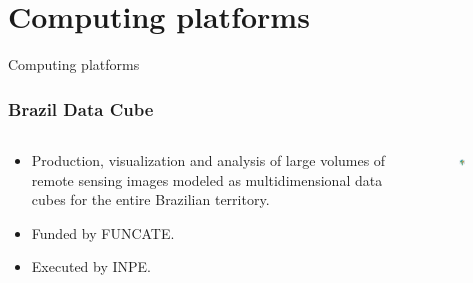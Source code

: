 \documentclass[aspectratio=169]{beamer}
\begin{document}
\section{Computing platforms}



\begin{frame}
    Computing platforms
\end{frame}



\begin{frame}
    \frametitle{Brazil Data Cube}
    \begin{columns}
        \begin{column}{0.5\textwidth}
            \begin{itemize}
                \item Production, visualization and analysis of large volumes 
                    of remote sensing images modeled as multidimensional data 
                    cubes for the entire Brazilian territory.
                \item Funded by FUNCATE. 
                \item Executed by INPE.
            \end{itemize}
        \end{column}
        \begin{column}{0.5\textwidth}
            \begin{figure}
                \centering
                \includegraphics[width=0.5\textwidth]
                {img/brazil_data_cube_logo.png}
                \caption{}
                \label{}
            \end{figure}
        \end{column}
    \end{columns}
\end{frame}
\end{document}
